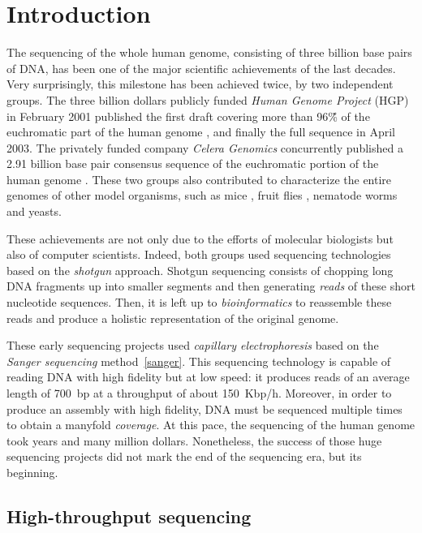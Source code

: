 \chapter{Introduction}

The sequencing of the whole human genome, consisting of three billion base pairs of DNA, has been one of the major scientific achievements of the last decades.
Very surprisingly, this milestone has been achieved twice, by two independent groups.
The three billion dollars publicly funded \emph{Human Genome Project} (HGP) in February 2001 published the first draft covering more than 96\~\% of the euchromatic part of the human genome \citep{hgp}, and finally the full sequence in April 2003.
The privately funded company \emph{Celera Genomics} concurrently published a 2.91 billion base pair consensus sequence of the euchromatic portion of the human genome \citep{celerahuman}.
These two groups also contributed to characterize the entire genomes of other model organisms, such as mice \citep{mouse}, fruit flies \citep{celerafly}, nematode worms and yeasts.

These achievements are not only due to the efforts of molecular biologists but also of computer scientists.
Indeed, both groups used sequencing technologies based on the \emph{shotgun} approach.
Shotgun sequencing consists of chopping long DNA fragments up into smaller segments and then generating \emph{reads} of these short nucleotide sequences.
Then, it is left up to \emph{bioinformatics} to reassemble these reads and produce a holistic representation of the original genome.

These early sequencing projects used \emph{capillary electrophoresis} based on the \emph{Sanger sequencing} method~\ref{sanger}.
This sequencing technology is capable of reading DNA with high fidelity but at low speed: it produces reads of an average length of 700~bp at a throughput of about 150~Kbp/h.
Moreover, in order to produce an assembly with high fidelity, DNA must be sequenced multiple times to obtain a manyfold \emph{coverage}.
At this pace, the sequencing of the human genome took years and many million dollars.
Nonetheless, the success of those huge sequencing projects did not mark the end of the sequencing era, but its beginning.


\section{High-throughput sequencing}

